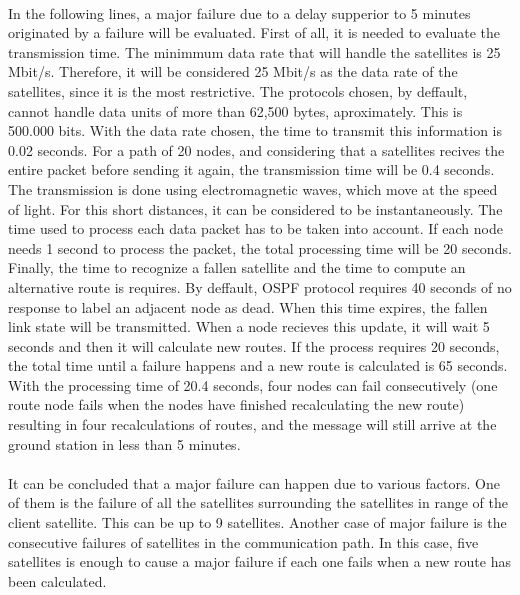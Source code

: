 \documentclass[12pt,a4paper]{report}
\begin{document}
\paragraph{}In the following lines, a major failure due to a delay supperior to 5 minutes originated by a failure will be evaluated. First of all, it is needed to evaluate the transmission time. The minimmum data rate that will handle the satellites is 25 Mbit/s. Therefore, it will be considered 25 Mbit/s as the data rate of the satellites, since it is the most restrictive. The protocols chosen, by deffault, cannot handle data units of more than 62,500 bytes, aproximately. This is 500.000 bits. With the data rate chosen, the time to transmit this information is 0.02 seconds. For a path of 20 nodes, and considering that a satellites recives the entire packet before sending it again, the transmission time will be 0.4 seconds. The transmission is done using electromagnetic waves, which move at the speed of light. For this short distances, it can be considered to be instantaneously. The time used to process each data packet has to be taken into account. If each node needs 1 second to process the packet, the total processing time will be 20 seconds. Finally, the time to recognize a fallen satellite and the time to compute an alternative route is requires. By deffault, OSPF protocol requires 40 seconds of no response to label an adjacent node as dead. When this time expires, the fallen link state will be transmitted. When a node recieves this update, it will wait 5 seconds and then it will calculate new routes. If the process requires 20 seconds, the total time until a failure happens and a new route is calculated is 65 seconds. With the processing time of 20.4 seconds, four nodes can fail consecutively (one route node fails when the nodes have finished recalculating the new route) resulting in four recalculations of routes, and the message will still arrive at the ground station in less than 5 minutes.

\paragraph{}It can be concluded that a major failure can happen due to various factors. One of them is the failure of all the satellites surrounding the satellites in range of the client satellite. This can be up to 9 satellites. Another case of major failure is the consecutive failures of satellites in the communication path. In this case, five satellites is enough to cause a major failure if each one fails when a new route has been calculated.
\end{document}

